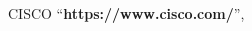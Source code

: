 \documentclass[a4paper]{article}
\begin{document}

\newpage
\tableofcontents
\newpage



\begin{thebibliography}{80}


CISCO
``\textbf{https://www.cisco.com/}'', 

\end{thebibliography}
\end{document}
